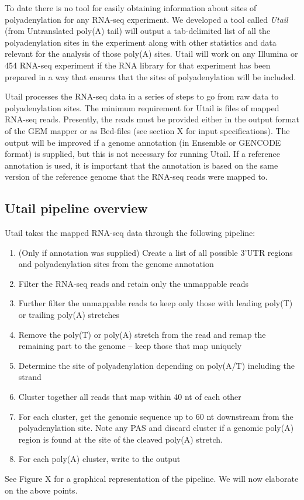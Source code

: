 %
To date there is no tool for easily obtaining information about sites of
polyadenylation for any RNA-seq experiment. We developed a tool called
\textit{Utail} (from Untranslated poly(A) tail) will output a tab-delimited
list of all the polyadenylation sites in the experiment along with other
statistics and data relevant for the analysis of those poly(A) sites. Utail
will work on any Illumina or 454 RNA-seq experiment if the RNA library for that
experiment has been prepared in a way that ensures that the sites of
polyadenylation will be included.

Utail processes the RNA-seq data in a series of steps to go from raw data to
polyadenylation sites. The minimum requirement for Utail is files of mapped
RNA-seq reads. Presently, the reads must be provided either in the output
format of the GEM mapper \cite{ribeca_gem_2010} or as Bed-files (see section X
for input specifications). The output will be improved if a genome annotation
(in Ensemble or GENCODE format) is supplied, but this is not necessary for
running Utail. If a reference annotation is used, it is important that the
annotation is based on the same version of the reference genome that the
RNA-seq reads were mapped to.

\subsection{Utail pipeline overview}

Utail takes the mapped RNA-seq data through the following pipeline:
\begin{enumerate}
	\item (Only if annotation was supplied) Create a list of all possible
		3'UTR regions and polyadenylation sites from the genome annotation
	\item Filter the RNA-seq reads and retain only the unmappable reads
	\item Further filter the unmappable reads to keep only those with leading
		poly(T) or trailing poly(A) stretches
	\item Remove the poly(T) or poly(A) stretch from the read and remap the
		remaining part to the genome -- keep those that map uniquely
	\item Determine the site of polyadenylation depending on poly(A/T)
		including the strand
	\item Cluster together all reads that map within 40 nt of each other
	\item For each cluster, get the genomic sequence up to 60 nt downstream
		from the polyadenylation site. Note any PAS and discard cluster if a
		genomic poly(A) region is found at the site of the cleaved poly(A)
		stretch.
	\item For each poly(A) cluster, write to the output
\end{enumerate}
See Figure X for a graphical representation of the pipeline. We will now
elaborate on the above points.\\

